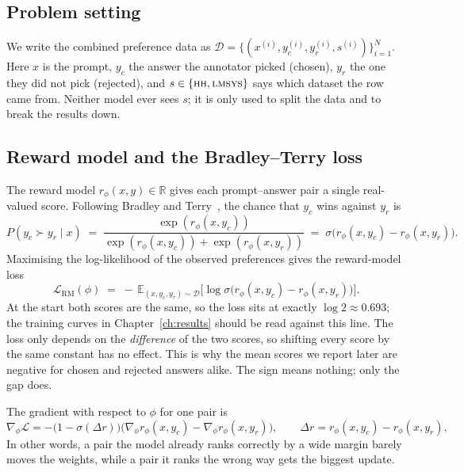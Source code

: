 \subsection{Problem setting}
We write the combined preference data as $\mathcal{D} = \{(x^{(i)}, y_c^{(i)}, y_r^{(i)}, s^{(i)})\}_{i=1}^{N}$. Here $x$ is the prompt, $y_c$ the answer the annotator picked (chosen), $y_r$ the one they did not pick (rejected), and $s\in\{\textsc{hh}, \textsc{lmsys}\}$ says which dataset the row came from. Neither model ever sees $s$; it is only used to split the data and to break the results down.

\subsection{Reward model and the Bradley--Terry loss}
The reward model $r_\phi(x,y)\in\mathbb{R}$ gives each prompt--answer pair a single real-valued score. Following Bradley and Terry~\cite{bradley1952rank}, the chance that $y_c$ wins against $y_r$ is
\begin{equation}
  P(y_c \succ y_r \mid x) \;=\; \frac{\exp(r_\phi(x,y_c))}{\exp(r_\phi(x,y_c)) + \exp(r_\phi(x,y_r))} \;=\; \sigma\big(r_\phi(x,y_c) - r_\phi(x,y_r)\big).
  \label{eq:bt}
\end{equation}
Maximising the log-likelihood of the observed preferences gives the reward-model loss
\begin{equation}
  \mathcal{L}_{\mathrm{RM}}(\phi) \;=\; -\,\mathbb{E}_{(x,y_c,y_r)\sim\mathcal{D}}\Big[\log\sigma\big(r_\phi(x,y_c) - r_\phi(x,y_r)\big)\Big].
  \label{eq:rmloss}
\end{equation}
At the start both scores are the same, so the loss sits at exactly $\log 2 \approx 0.693$; the training curves in Chapter~\ref{ch:results} should be read against this line. The loss only depends on the \emph{difference} of the two scores, so shifting every score by the same constant has no effect. This is why the mean scores we report later are negative for chosen and rejected answers alike. The sign means nothing; only the gap does.

The gradient with respect to $\phi$ for one pair is
\begin{equation}
  \nabla_\phi\mathcal{L} = -\big(1-\sigma(\Delta r)\big)\big(\nabla_\phi r_\phi(x,y_c) - \nabla_\phi r_\phi(x,y_r)\big),\qquad \Delta r = r_\phi(x,y_c)-r_\phi(x,y_r),
\end{equation}
In other words, a pair the model already ranks correctly by a wide margin barely moves the weights, while a pair it ranks the wrong way gets the biggest update.

